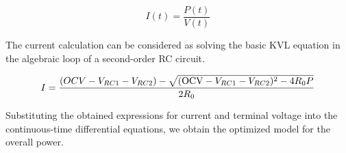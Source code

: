 \begin{equation}
    I(t) = \frac{P(t)}{V(t)}
\end{equation}

The current calculation can be considered as solving the basic KVL equation in the algebraic loop of a second-order RC circuit.


\begin{equation}
    I = \frac{(OCV - V_{RC1} - V_{RC2}) - \sqrt{(\text{OCV} - V_{RC1} - V_{RC2})^2 - 4R_0 P}}{2R_0}
    \label{eq:current_solve}
\end{equation}


Substituting the obtained expressions for current and terminal voltage into the continuous-time differential equations, we obtain the optimized model for the overall power.